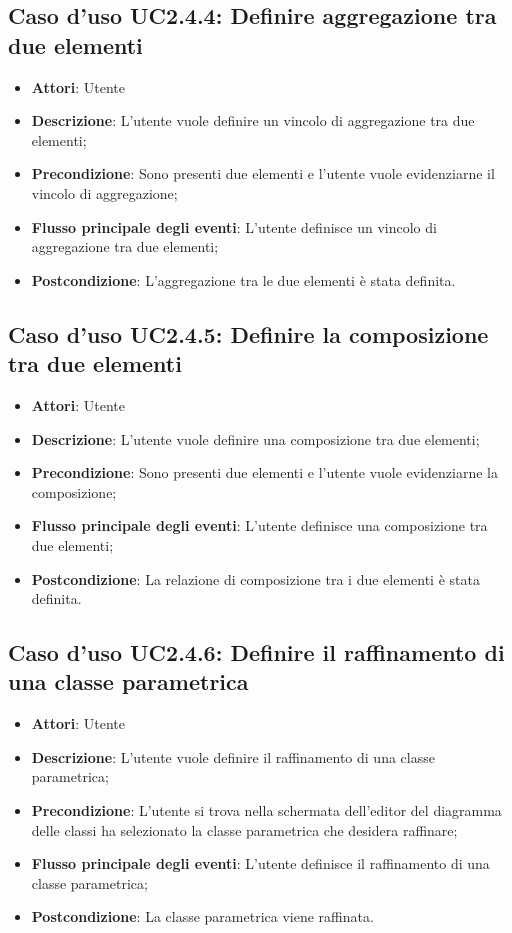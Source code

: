 \documentclass[../AnalisiDeiRequisiti.tex]{subfiles}
\begin{document}
		\subsection{Caso d'uso UC2.4.4: Definire aggregazione tra due elementi}
		\begin{itemize}
			\item \textbf{Attori}: Utente
			\item \textbf{Descrizione}: L'utente vuole definire un vincolo di aggregazione tra due elementi;
			\item \textbf{Precondizione}: Sono presenti due elementi e l'utente vuole evidenziarne il vincolo di aggregazione;
			\item \textbf{Flusso principale degli eventi}: L'utente definisce un vincolo di aggregazione tra due elementi;
			\item \textbf{Postcondizione}: L'aggregazione tra le due elementi è stata definita.
		\end{itemize}
		\subsection{Caso d'uso UC2.4.5: Definire la composizione tra due elementi}
		\begin{itemize}
			\item \textbf{Attori}: Utente
			\item \textbf{Descrizione}: L'utente vuole definire una composizione tra due elementi;
			\item \textbf{Precondizione}: Sono presenti due elementi e l'utente vuole evidenziarne la composizione;
			\item \textbf{Flusso principale degli eventi}: L'utente definisce una composizione tra due elementi;
			\item \textbf{Postcondizione}: La relazione di composizione tra i due elementi è stata definita.
		\end{itemize}
		\subsection{Caso d'uso UC2.4.6: Definire il raffinamento di una classe parametrica}
		\begin{itemize}
			\item \textbf{Attori}: Utente
			\item \textbf{Descrizione}: L'utente vuole definire il raffinamento di una classe parametrica;
			\item \textbf{Precondizione}: L'utente si trova nella schermata dell'editor del diagramma delle classi ha selezionato la classe parametrica che desidera raffinare;
			\item \textbf{Flusso principale degli eventi}: L'utente definisce il raffinamento di una classe parametrica;
			\item \textbf{Postcondizione}: La classe parametrica viene raffinata.
		\end{itemize}
\end{document}
